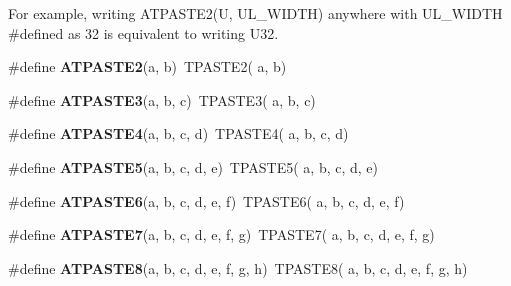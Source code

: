 For example, writing A\+T\+P\+A\+S\+T\+E2(\+U, U\+L\+\_\+\+W\+I\+D\+T\+H) anywhere with U\+L\+\_\+\+W\+I\+D\+T\+H \#defined as 32 is equivalent to writing U32. \begin{DoxyCompactItemize}
\item 
\hypertarget{group__group__sam0__utils__tpaste_gafd3b4e313492a0862292dc3072d8e347}{}\#define {\bfseries A\+T\+P\+A\+S\+T\+E2}(a,  b)~T\+P\+A\+S\+T\+E2( a, b)\label{group__group__sam0__utils__tpaste_gafd3b4e313492a0862292dc3072d8e347}

\item 
\hypertarget{group__group__sam0__utils__tpaste_ga80b7594516326045fbcaec54d7759c20}{}\#define {\bfseries A\+T\+P\+A\+S\+T\+E3}(a,  b,  c)~T\+P\+A\+S\+T\+E3( a, b, c)\label{group__group__sam0__utils__tpaste_ga80b7594516326045fbcaec54d7759c20}

\item 
\hypertarget{group__group__sam0__utils__tpaste_gad9dcc51074148a4ff01810033a41e282}{}\#define {\bfseries A\+T\+P\+A\+S\+T\+E4}(a,  b,  c,  d)~T\+P\+A\+S\+T\+E4( a, b, c, d)\label{group__group__sam0__utils__tpaste_gad9dcc51074148a4ff01810033a41e282}

\item 
\hypertarget{group__group__sam0__utils__tpaste_ga4e4994267872724c11e31f1274c1a84c}{}\#define {\bfseries A\+T\+P\+A\+S\+T\+E5}(a,  b,  c,  d,  e)~T\+P\+A\+S\+T\+E5( a, b, c, d, e)\label{group__group__sam0__utils__tpaste_ga4e4994267872724c11e31f1274c1a84c}

\item 
\hypertarget{group__group__sam0__utils__tpaste_ga5bbd1842581ea1fa81616d3222bda308}{}\#define {\bfseries A\+T\+P\+A\+S\+T\+E6}(a,  b,  c,  d,  e,  f)~T\+P\+A\+S\+T\+E6( a, b, c, d, e, f)\label{group__group__sam0__utils__tpaste_ga5bbd1842581ea1fa81616d3222bda308}

\item 
\hypertarget{group__group__sam0__utils__tpaste_gabecc8ad964051f6f877f14dd13919b18}{}\#define {\bfseries A\+T\+P\+A\+S\+T\+E7}(a,  b,  c,  d,  e,  f,  g)~T\+P\+A\+S\+T\+E7( a, b, c, d, e, f, g)\label{group__group__sam0__utils__tpaste_gabecc8ad964051f6f877f14dd13919b18}

\item 
\hypertarget{group__group__sam0__utils__tpaste_ga303651436fcc8283bd17c13578476c8e}{}\#define {\bfseries A\+T\+P\+A\+S\+T\+E8}(a,  b,  c,  d,  e,  f,  g,  h)~T\+P\+A\+S\+T\+E8( a, b, c, d, e, f, g, h)\label{group__group__sam0__utils__tpaste_ga303651436fcc8283bd17c13578476c8e}


\end{DoxyCompactItemize}
